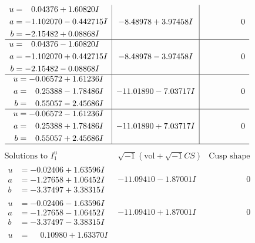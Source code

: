 \documentclass[1p]{elsarticle_modified}
\theoremstyle{definition}
\newcommand{\I}{\sqrt{-1}}
\begin{document}
$$\begin{array}{c|c|c}
\begin{aligned}
u &= \phantom{-}0.04376 + 1.60820 I \\
a &= -1.102070 - 0.442715 I \\
b &= -2.15482 + 0.08868 I\end{aligned}
 & -8.48978 + 3.97458 I & \phantom{-0.000000 } 0 \\ \hline\begin{aligned}
u &= \phantom{-}0.04376 - 1.60820 I \\
a &= -1.102070 + 0.442715 I \\
b &= -2.15482 - 0.08868 I\end{aligned}
 & -8.48978 - 3.97458 I & \phantom{-0.000000 } 0 \\ \hline\begin{aligned}
u &= -0.06572 + 1.61236 I \\
a &= \phantom{-}0.25388 - 1.78486 I \\
b &= \phantom{-}0.55057 - 2.45686 I\end{aligned}
 & -11.01890 - 7.03717 I & \phantom{-0.000000 } 0 \\ \hline\begin{aligned}
u &= -0.06572 - 1.61236 I \\
a &= \phantom{-}0.25388 + 1.78486 I \\
b &= \phantom{-}0.55057 + 2.45686 I\end{aligned}
 & -11.01890 + 7.03717 I & \phantom{-0.000000 } 0\\
 \hline 
 \end{array}$$\newpage$$\begin{array}{c|c|c}  
\text{Solutions to }I^u_{1}& \I (\text{vol} + \sqrt{-1}CS) & \text{Cusp shape}\\
 \hline 
\begin{aligned}
u &= -0.02406 + 1.63596 I \\
a &= -1.27658 + 1.06452 I \\
b &= -3.37497 + 3.38315 I\end{aligned}
 & -11.09410 - 1.87001 I & \phantom{-0.000000 } 0 \\ \hline\begin{aligned}
u &= -0.02406 - 1.63596 I \\
a &= -1.27658 - 1.06452 I \\
b &= -3.37497 - 3.38315 I\end{aligned}
 & -11.09410 + 1.87001 I & \phantom{-0.000000 } 0 \\ \hline\begin{aligned}
u &= \phantom{-}0.10980 + 1.63370 I \\

\end{aligned}
\end{array}$$
\end{document}
